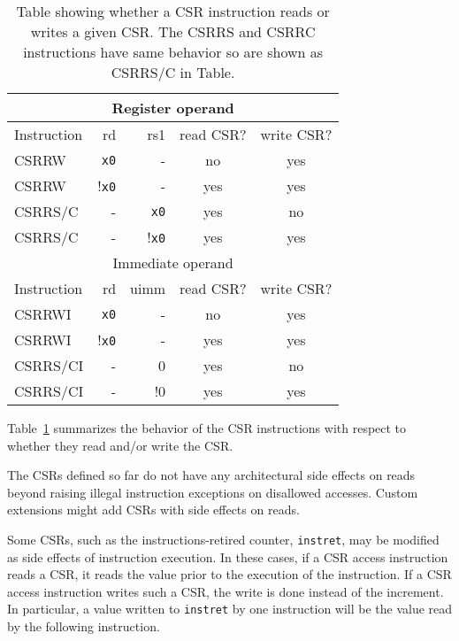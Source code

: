 \begin{table}
  \centering
  \begin{tabular}{|l|r|r|c|c|}
    \hline
    \multicolumn{5}{|c|}{Register operand} \\
    \hline
  Instruction &  rd &  rs1 & read CSR? & write CSR? \\
    \hline
    CSRRW     &  {\tt x0} &   -        &       no  &       yes \\
    CSRRW     & !{\tt x0} &   -        &      yes  &       yes \\
    CSRR{S/C} &        -  &   {\tt x0} &       yes &       no \\
    CSRR{S/C} &       -   &  !{\tt x0} &       yes &      yes \\
    \hline
    \multicolumn{5}{|c|}{Immediate operand} \\
    \hline
Instruction & rd   & uimm & read CSR? & write CSR? \\
    \hline
   CSRRWI   &   {\tt x0} &  -   &     no    &      yes    \\
   CSRRWI   &  !{\tt x0} &  -   &    yes    &      yes    \\ 
 CSRR{S/C}I &       -    &  0   &    yes    &       no    \\
 CSRR{S/C}I &       -    & !0   &    yes    &      yes    \\
 \hline
  \end{tabular}
  \caption{Table showing whether a CSR instruction reads or writes a
    given CSR.  The CSRRS and CSRRC instructions have same behavior so
  are shown as CSRR{S/C} in Table.}
  \label{tab:csrsideeffects}
\end{table}

Table~\ref{tab:csrsideeffects} summarizes the behavior of the CSR
instructions with respect to whether they read and/or write the CSR.

\begin{commentary}
  The CSRs defined so far do not have any architectural side effects on reads
  beyond raising illegal instruction exceptions on disallowed accesses.
  Custom extensions might add CSRs with side effects on reads.
\end{commentary}

Some CSRs, such as the instructions-retired counter, {\tt instret},
may be modified as side effects of instruction execution.  In these
cases, if a CSR access instruction reads a CSR, it reads the value
prior to the execution of the instruction.  If a CSR access
instruction writes such a CSR, the write is done instead of the
increment.  In particular, a value written to {\tt instret} by one
instruction will be the value read by the following instruction.

